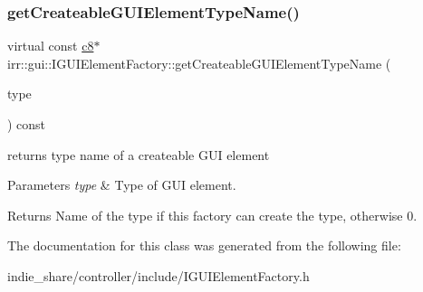\subsubsection{\texorpdfstring{get\+Createable\+G\+U\+I\+Element\+Type\+Name()}{getCreateableGUIElementTypeName()}\hspace{0.1cm}{\footnotesize\ttfamily [2/2]}}
{\footnotesize\ttfamily virtual const \hyperlink{namespaceirr_a9395eaea339bcb546b319e9c96bf7410}{c8}$\ast$ irr\+::gui\+::\+I\+G\+U\+I\+Element\+Factory\+::get\+Createable\+G\+U\+I\+Element\+Type\+Name (\begin{DoxyParamCaption}\item[{\hyperlink{namespaceirr_1_1gui_ae4d66df0ecf4117cdbcf9f22404bd254}{E\+G\+U\+I\+\_\+\+E\+L\+E\+M\+E\+N\+T\+\_\+\+T\+Y\+PE}}]{type }\end{DoxyParamCaption}) const\hspace{0.3cm}{\ttfamily [pure virtual]}}



returns type name of a createable G\+UI element 


\begin{DoxyParams}{Parameters}
{\em type} & Type of G\+UI element. \\
\hline
\end{DoxyParams}
\begin{DoxyReturn}{Returns}
Name of the type if this factory can create the type, otherwise 0. 
\end{DoxyReturn}


The documentation for this class was generated from the following file\+:\begin{DoxyCompactItemize}
\item 
indie\+\_\+share/controller/include/I\+G\+U\+I\+Element\+Factory.\+h\end{DoxyCompactItemize}

